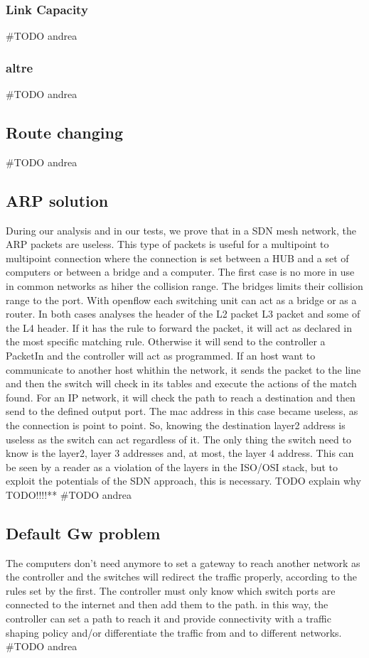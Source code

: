 \documentclass[conference,10pt]{IEEEtran}
\begin{document}
    \subsubsection{Link Capacity}
    \#TODO andrea
    \subsubsection{altre}
    \#TODO andrea
    
  \subsection{Route changing} %
  \#TODO andrea
  
  \subsection{ARP solution} %
  During our analysis and in our tests, we prove that in a SDN mesh network, the ARP packets are useless.
  This type of packets is useful for a multipoint to multipoint connection where the connection is set between a
  HUB and a set of computers or between a bridge and a computer. The first case is no more in use in common networks as
  hiher the collision range. The bridges limits their collision range to the port. With openflow each switching unit can
  act as a bridge or as a router. In both cases analyses the header of the L2 packet L3 packet and some of the L4 header.
  If it has the rule to forward the packet, it will act as declared in the most specific matching rule. Otherwise it will
  send to the controller a PacketIn and the controller will act as programmed. If an host want to communicate to another host whithin
  the network, it sends the packet to the line and then the switch will check in its tables and execute the actions of the match found.
  For an IP network, it will check the path to reach a destination and then send to the defined output port. The mac address in this case
  became useless, as the connection is point to point. So, knowing the destination layer2 address is useless as the switch can act
  regardless of it. The only thing the switch need to know is the layer2, layer 3 addresses and, at most, the layer 4 address.
  This can be seen by a reader as a violation of the layers in the ISO/OSI stack, but to exploit the potentials of the SDN approach,
  this is necessary. TODO explain why TODO!!!!**
  \#TODO andrea
  
  \subsection{Default Gw problem} 
  The computers don't need anymore to set a gateway to reach another network as the controller and the switches will redirect the traffic
  properly, according to the rules set by the first. The controller must only know which switch ports are connected to the
  internet and then add them to the path. in this way, the controller can set a path to reach it and provide connectivity with
  a traffic shaping policy and/or differentiate the traffic from and to different networks. 
  \#TODO andrea
  
\end{document}
